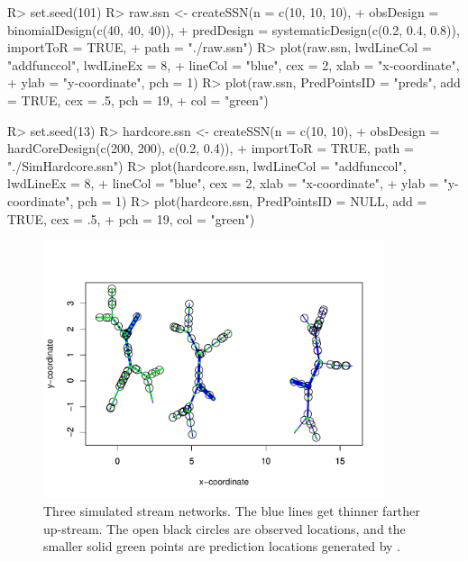 \documentclass[nojss]{jss}
\renewenvironment{Schunk}{\vspace{\topsep}}{\vspace{\topsep}}
\begin{document}
\begin{Schunk}
\begin{Sinput}
R> set.seed(101)
R> raw.ssn <- createSSN(n = c(10, 10, 10),
+     obsDesign = binomialDesign(c(40, 40, 40)),
+     predDesign = systematicDesign(c(0.2, 0.4, 0.8)), importToR = TRUE,
+     path = "./raw.ssn")
R> plot(raw.ssn, lwdLineCol = "addfunccol", lwdLineEx = 8,
+     lineCol = "blue", cex = 2, xlab = "x-coordinate",
+     ylab = "y-coordinate", pch = 1)
R> plot(raw.ssn, PredPointsID = "preds", add = TRUE, cex = .5, pch = 19,
+     col = "green")
\end{Sinput}
\end{Schunk}

\begin{Schunk}
\begin{Sinput}
R> set.seed(13)
R> hardcore.ssn <- createSSN(n = c(10, 10),
+     obsDesign = hardCoreDesign(c(200, 200), c(0.2, 0.4)),
+     importToR = TRUE, path = "./SimHardcore.ssn")
R> plot(hardcore.ssn, lwdLineCol = "addfunccol", lwdLineEx = 8,
+     lineCol = "blue", cex = 2, xlab = "x-coordinate",
+     ylab = "y-coordinate", pch = 1)
R> plot(hardcore.ssn, PredPointsID = NULL, add = TRUE, cex = .5,
+     pch = 19, col = "green")
\end{Sinput}
\end{Schunk}

\begin{figure}[htb]
  \begin{center}
    \includegraphics[keepaspectratio=true, width = 100mm]{Figures/jss984Fig-SimSSN1}
    \caption{Three simulated stream networks. The blue lines get
      thinner farther up-stream. The open black circles are observed
      locations, and the smaller solid green points are prediction
      locations generated by . \label{SimSSN1}}
  \end{center}
\end{figure}
\end{document}
